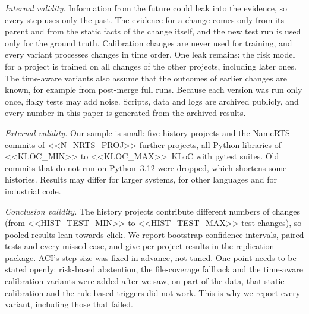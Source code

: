 \documentclass[conference]{IEEEtran}
\begin{document}
\textit{Internal validity.} Information from the future could leak into the evidence, so every step uses only the past. The evidence for a change comes only from its parent and from the static facts of the change itself, and the new test run is used only for the ground truth. Calibration changes are never used for training, and every variant processes changes in time order. One leak remains: the risk model for a project is trained on all changes of the other projects, including later ones. The time-aware variants also assume that the outcomes of earlier changes are known, for example from post-merge full runs. Because each version was run only once, flaky tests may add noise. Scripts, data and logs are archived publicly, and every number in this paper is generated from the archived results.

\textit{External validity.} Our sample is small: five history projects and the NameRTS commits of <<N_NRTS_PROJ>> further projects, all Python libraries of <<KLOC_MIN>> to <<KLOC_MAX>>~KLoC with pytest suites. Old commits that do not run on Python~3.12 were dropped, which shortens some histories. Results may differ for larger systems, for other languages and for industrial code.

\textit{Conclusion validity.} The history projects contribute different numbers of changes (from <<HIST_TEST_MIN>> to <<HIST_TEST_MAX>> test changes), so pooled results lean towards click. We report bootstrap confidence intervals, paired tests and every missed case, and give per-project results in the replication package. ACI's step size was fixed in advance, not tuned. One point needs to be stated openly: risk-based abstention, the file-coverage fallback and the time-aware calibration variants were added after we saw, on part of the data, that static calibration and the rule-based triggers did not work. This is why we report every variant, including those that failed.

\end{document}
